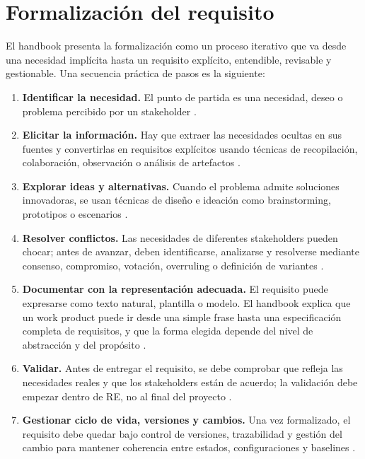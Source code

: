 \section{Formalizaci\'on del requisito}
El handbook presenta la formalizaci\'on como un proceso iterativo que va desde una necesidad impl\'icita hasta un requisito expl\'icito, entendible, revisable y gestionable. Una secuencia pr\'actica de pasos es la siguiente:

\begin{enumerate}[leftmargin=1.2em]
  \item \textbf{Identificar la necesidad.} El punto de partida es una necesidad, deseo o problema percibido por un stakeholder \cite[p.~10]{cpre}.
  \item \textbf{Elicitar la informaci\'on.} Hay que extraer las necesidades ocultas en sus fuentes y convertirlas en requisitos expl\'icitos usando t\'ecnicas de recopilaci\'on, colaboraci\'on, observaci\'on o an\'alisis de artefactos \cite[pp.~88--95]{cpre}.
  \item \textbf{Explorar ideas y alternativas.} Cuando el problema admite soluciones innovadoras, se usan t\'ecnicas de dise\~no e ideaci\'on como brainstorming, prototipos o escenarios \cite[pp.~96--99]{cpre}.
  \item \textbf{Resolver conflictos.} Las necesidades de diferentes stakeholders pueden chocar; antes de avanzar, deben identificarse, analizarse y resolverse mediante consenso, compromiso, votaci\'on, overruling o definici\'on de variantes \cite[pp.~100--108]{cpre}.
  \item \textbf{Documentar con la representaci\'on adecuada.} El requisito puede expresarse como texto natural, plantilla o modelo. El handbook explica que un work product puede ir desde una simple frase hasta una especificaci\'on completa de requisitos, y que la forma elegida depende del nivel de abstracci\'on y del prop\'osito \cite[pp.~30--32]{cpre}.
  \item \textbf{Validar.} Antes de entregar el requisito, se debe comprobar que refleja las necesidades reales y que los stakeholders est\'an de acuerdo; la validaci\'on debe empezar dentro de RE, no al final del proyecto \cite[pp.~109--111]{cpre}.
  \item \textbf{Gestionar ciclo de vida, versiones y cambios.} Una vez formalizado, el requisito debe quedar bajo control de versiones, trazabilidad y gesti\'on del cambio para mantener coherencia entre estados, configuraciones y baselines \cite[pp.~131--140]{cpre}.
\end{enumerate}
